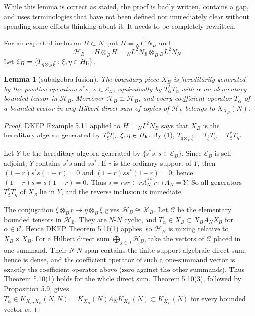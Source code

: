 \documentclass[12pt]{article}
\newtheorem{lemma}{Lemma}
\newcommand{\cH}{\mathcal H}
\newcommand{\review}[1]{\begin{reviewbox}#1\end{reviewbox}}
\begin{document}
\review{While this lemma is correct as stated, the proof is badly written, contains a gap, and uses terminologies that have not been defined nor immediately clear without spending some efforts thinking about it. It needs to be completely rewritten.}

For an expected inclusion \(B\subset N\), put \(H={}_NL^2N_B\) and
\[
        \cH_B=H\otimes_B\overline H
             ={}_NL^2N_B\otimes_B{}_BL^2N_N .
\]
Let \(\mathcal E_B=\{T_{\eta\otimes_B\bar\xi}:\xi,\eta\in H_{\rm b}\}\).

\begin{lemma}[subalgebra fusion]\label{lem:subalg}
The boundary piece \(X_B\) is hereditarily generated by the positive
operators \(s^*s\), \(s\in\mathcal E_B\), equivalently by
\(T_\alpha^*T_\alpha\) with \(\alpha\) an elementary bounded tensor in
\(\cH_B\).  Moreover \(\cH_B\cong\overline{\cH_B}\), and every coefficient
operator \(T_\alpha\) of a bounded vector in any Hilbert direct sum of copies
of \(\cH_B\) belongs to \(K_{X_B}(N)\).
\end{lemma}

\begin{proof}
DKEP Example 5.11 applied to \(H={}_NL^2N_B\) says that \(X_B\) is the
hereditary algebra generated by \(T_\xi^*T_\eta\), \(\xi,\eta\in H_{\rm b}\).
By (1), \(T_{\eta\otimes_B\bar\xi}=T_{\bar\xi}T_\eta=T_\xi^*T_\eta\).

Let \(Y\) be the hereditary algebra generated by \(\{s^*s:s\in\mathcal E_B\}\).
Since \(\mathcal E_B\) is self-adjoint, \(Y\) contains \(s^*s\) and \(ss^*\).
If \(r\) is the ordinary support of \(Y\), then
\((1-r)s^*s(1-r)=0\) and \((1-r)ss^*(1-r)=0\); hence \((1-r)s=s(1-r)=0\).
Thus \(s=rsr\in rA_N^{**}r\cap A_N=Y\).  So all generators
\(T_\xi^*T_\eta\) of \(X_B\) lie in \(Y\), and the reverse inclusion is
immediate.

The conjugation \(\overline{\xi\otimes_B\bar\eta}\mapsto
\eta\otimes_B\bar\xi\) gives \(\overline{\cH_B}\cong\cH_B\).  Let
\(\mathcal C\) be the elementary bounded tensors in \(\cH_B\).  They are
\(N\)-\(N\) cyclic, and \(T_\alpha\in X_B\subset X_BA_NX_B\) for
\(\alpha\in\mathcal C\).  Hence DKEP Theorem 5.10(1) applies, so \(\cH_B\) is
mixing relative to \(X_B\times X_B\).  For a Hilbert direct sum
\(\bigoplus_{j\in J}\cH_B\), take the vectors of \(\mathcal C\) placed in one
summand.  Their \(N\)-\(N\) span contains the finite-support algebraic direct
sum, hence is dense, and the coefficient operator of such a one-summand vector
is exactly the coefficient operator above (zero against the other summands).
Thus Theorem 5.10(1) holds for the whole direct sum.  Theorem 5.10(3), followed
by Proposition 5.9, gives \(T_\alpha\in K_{X_B,X_B}(N,N)=K_{X_B}(N)A_N
K_{X_B}(N)\subset K_{X_B}(N)\) for every bounded vector \(\alpha\).
\end{proof}
\end{document}
